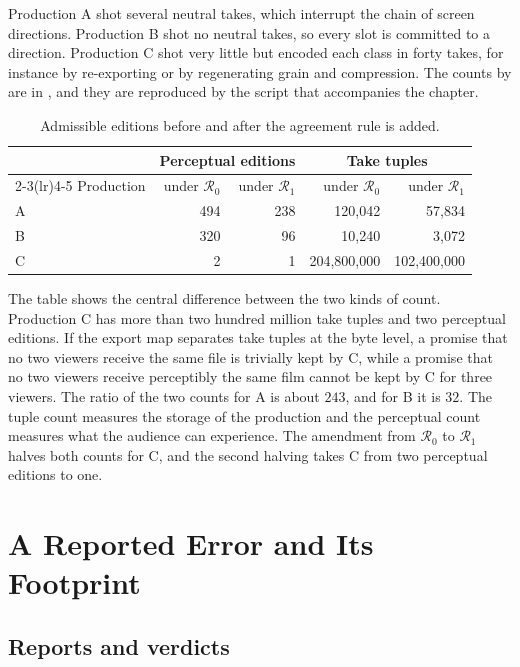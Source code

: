 \documentclass[11pt,twoside,openright]{book}
\theoremstyle{plain}
\theoremstyle{definition}
\theoremstyle{remark}
\begin{document}
Production A shot several neutral takes, which interrupt the chain of screen directions. Production B shot no neutral takes, so every slot is committed to a direction. Production C shot very little but encoded each class in forty takes, for instance by re-exporting or by regenerating grain and compression. The counts by  are in , and they are reproduced by the script that accompanies the chapter.

\begin{table}[ht]
\centering
\begin{tabular}{@{}lrrrr@{}}
\toprule
 & \multicolumn{2}{c}{Perceptual editions} & \multicolumn{2}{c}{Take tuples}\\
\cmidrule(lr){2-3}\cmidrule(lr){4-5}
Production & under $\mathcal R_0$ & under $\mathcal R_1$ & under $\mathcal R_0$ & under $\mathcal R_1$\\
\midrule
A & 494 & 238 & 120,042 & 57,834\\
B & 320 & 96 & 10,240 & 3,072\\
C & 2 & 1 & 204,800,000 & 102,400,000\\
\bottomrule
\end{tabular}
\caption{Admissible editions before and after the agreement rule is added.}\label{tab:counts}
\end{table}

The table shows the central difference between the two kinds of count. Production C has more than two hundred million take tuples and two perceptual editions. If the export map separates take tuples at the byte level, a promise that no two viewers receive the same file is trivially kept by C, while a promise that no two viewers receive perceptibly the same film cannot be kept by C for three viewers. The ratio of the two counts for A is about $243$, and for B it is $32$. The tuple count measures the storage of the production and the perceptual count measures what the audience can experience. The amendment from $\mathcal R_0$ to $\mathcal R_1$ halves both counts for C, and the second halving takes C from two perceptual editions to one.

\section{A Reported Error and Its Footprint}\label{sec:error}

\subsection{Reports and verdicts}
\end{document}
